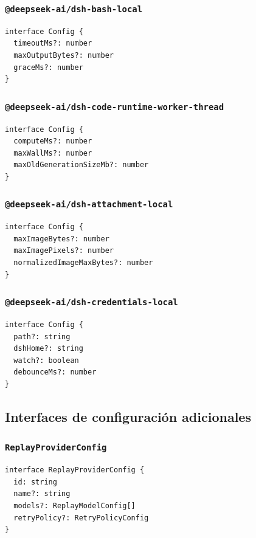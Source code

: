 \documentclass[11pt,a4paper]{article}
\begin{document}
\subsubsection*{\texttt{@deepseek-ai/dsh-bash-local}}


\begin{lstlisting}
interface Config {
  timeoutMs?: number
  maxOutputBytes?: number
  graceMs?: number
}
\end{lstlisting}


\subsubsection*{\texttt{@deepseek-ai/dsh-code-runtime-worker-thread}}


\begin{lstlisting}
interface Config {
  computeMs?: number
  maxWallMs?: number
  maxOldGenerationSizeMb?: number
}
\end{lstlisting}


\subsubsection*{\texttt{@deepseek-ai/dsh-attachment-local}}


\begin{lstlisting}
interface Config {
  maxImageBytes?: number
  maxImagePixels?: number
  normalizedImageMaxBytes?: number
}
\end{lstlisting}


\subsubsection*{\texttt{@deepseek-ai/dsh-credentials-local}}


\begin{lstlisting}
interface Config {
  path?: string
  dshHome?: string
  watch?: boolean
  debounceMs?: number
}
\end{lstlisting}


\subsection*{Interfaces de configuración adicionales}


\subsubsection*{\texttt{ReplayProviderConfig}}


\begin{lstlisting}
interface ReplayProviderConfig {
  id: string
  name?: string
  models?: ReplayModelConfig[]
  retryPolicy?: RetryPolicyConfig
}
\end{lstlisting}
\end{document}
